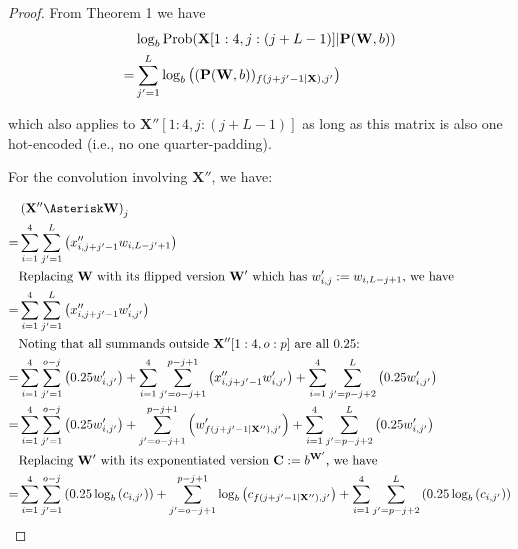 \documentclass[12pt]{article}
\newcommand{\matrixSymbol}[1]{\mathbf{#1}}
\begin{document}
\begin{proof}

From Theorem 1 we have
\begin{align} 
  & \log_{b}{\mathrm{Prob}(\matrixSymbol{X}[1:4, j:(j+L-1)]|\matrixSymbol{P}(\matrixSymbol{W}, b))} \notag \\
= & \sum_{j'=1}^{L}{\log_{b}{\left( (\matrixSymbol{P}(\matrixSymbol{W}, b))_{f(j + j' - 1|\matrixSymbol{X}), j'}\right)}}
\end{align}

which also applies to $\matrixSymbol{X''}[1:4, j:(j+L-1)]$ as long as this matrix is also one hot-encoded (i.e., no one quarter-padding).

For the convolution involving $\matrixSymbol{X''}$, we have:

\begin{align}
  & \left( \matrixSymbol{X''} \Asterisk \matrixSymbol{W} \right)_j \notag \\
= & \sum_{i=1}^{4}{\sum_{j'=1}^{L}{ \left( x''_{i, j+j'-1}w_{i, L-j'+1} \right) } } \\
  & \text{Replacing $\matrixSymbol{W}$ with its flipped version $\matrixSymbol{W'}$ which has $w'_{i, j} := w_{i, L-j+1}$, we have} \notag \\
= & \sum_{i=1}^{4}{\sum_{j'=1}^{L}{ \left( x''_{i, j+j'-1}w'_{i, j'} \right) }  } \\
  & \text{Noting that all summands outside $\matrixSymbol{X''}[1:4, o:p]$ are all 0.25:} \notag \\
= & \sum_{i=1}^{4}{\sum_{j'=1}^{o - j}{ \left( 0.25w'_{i, j'} \right) }  } + \sum_{i=1}^{4}{\sum_{j'=o - j + 1}^{p - j + 1}{ \left( x''_{i, j+j'-1}w'_{i, j'} \right) }  } + \sum_{i=1}^{4}{\sum_{j'=p - j + 2}^{L}{ \left( 0.25w'_{i, j'} \right) }  }\\
= &  \sum_{i=1}^{4}{\sum_{j'=1}^{o - j}{ \left( 0.25w'_{i, j'} \right) }  } + \sum_{j'=o - j + 1}^{p - j + 1}{\left( w'_{f(j+j'-1|\matrixSymbol{X''}), j'} \right) } + \sum_{i=1}^{4}{\sum_{j'=p - j + 2}^{L}{ \left( 0.25w'_{i, j'} \right) }  } \notag \\
  & \text{Replacing $\matrixSymbol{W'}$ with its exponentiated version $\matrixSymbol{C} := b^{\matrixSymbol{W'}}$, we have} \notag \\
= & \sum_{i=1}^{4}{\sum_{j'=1}^{o - j}{ \left( 0.25 \log_{b}\left(c_{i, j'}\right) \right) }  } + \sum_{j'=o - j + 1}^{p - j + 1}{ \log_{b}\left( c_{f(j + j' - 1|\matrixSymbol{X''}), j'} \right) } + \sum_{i=1}^{4}{\sum_{j'=p - j + 2}^{L}{ \left(  0.25\log_{b}\left(c_{i, j'}\right) \right) }  }\\

\end{align}
\end{proof}
\end{document}
